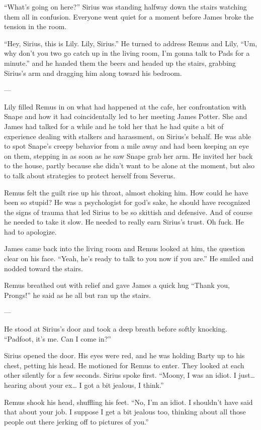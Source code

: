 \documentclass[12pt,twoside,openright]{memoir}
\begin{document}
``What's going on here?'' Sirius was standing halfway down the stairs watching them all in confusion. Everyone went quiet for a moment before James broke the tension in the room. 

``Hey, Sirius, this is Lily. Lily, Sirius.'' He turned to address Remus and Lily, ``Um, why don't you two go catch up in the living room, I'm gonna talk to Pads for a minute.'' and he handed them the beers and headed up the stairs, grabbing Sirius's arm and dragging him along toward his bedroom.

---

Lily filled Remus in on what had happened at the cafe, her confrontation with Snape and how it had coincidentally led to her meeting James Potter. She and James had talked for a while and he told her that he had quite a bit of experience dealing with stalkers and harassment, on Sirius's behalf. He was able to spot Snape's creepy behavior from a mile away and had been keeping an eye on them, stepping in as soon as he saw Snape grab her arm. He invited her back to the house, partly because she didn't want to be alone at the moment, but also to talk about strategies to protect herself from Severus.

Remus felt the guilt rise up his throat, almost choking him. How could he have been so stupid? He was a psychologist for god's sake, he should have recognized the signs of trauma that led Sirius to be so skittish and defensive. And of course he needed to take it slow. He needed to really earn Sirius's trust. Oh fuck. He had to apologize.

James came back into the living room and Remus looked at him, the question clear on his face. ``Yeah, he's ready to talk to you now if you are.'' He smiled and nodded toward the stairs. 

Remus breathed out with relief and gave James a quick hug ``Thank you, Prongs!'' he said as he all but ran up the stairs.

---

He stood at Sirius's door and took a deep breath before softly knocking. ``Padfoot, it's me. Can I come in?''

Sirius opened the door. His eyes were red, and he was holding Barty up to his chest, petting his head. He motioned for Remus to enter. They looked at each other silently for a few seconds. Sirius spoke first. ``Moony, I was an idiot. I just… hearing about your ex… I got a bit jealous, I think.''

Remus shook his head, shuffling his feet. ``No, I'm an idiot. I shouldn't have said that about your job. I suppose I get a bit jealous too, thinking about all those people out there jerking off to pictures of you.''
\end{document}
